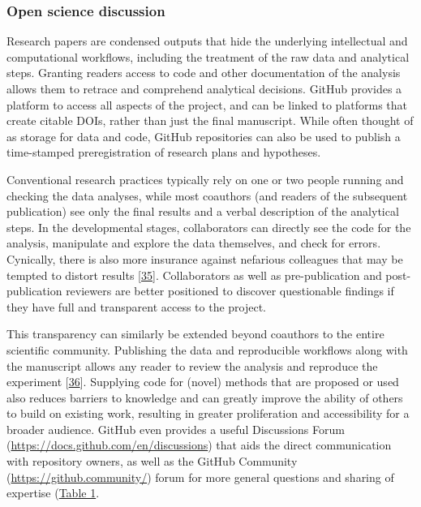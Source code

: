\hypertarget{open-science-discussion}{%
\subsubsection{Open science discussion}\label{open-science-discussion}}

Research papers are condensed outputs that hide the underlying intellectual and computational workflows, including the treatment of the raw data and analytical steps.
Granting readers access to code and other documentation of the analysis allows them to retrace and comprehend analytical decisions.
GitHub provides a platform to access all aspects of the project, and can be linked to platforms that create citable DOIs, rather than just the final manuscript.
While often thought of as storage for data and code, GitHub repositories can also be used to publish a time-stamped preregistration of research plans and hypotheses.

Conventional research practices typically rely on one or two people running and checking the data analyses, while most coauthors (and readers of the subsequent publication) see only the final results and a verbal description of the analytical steps.
In the developmental stages, collaborators can directly see the code for the analysis, manipulate and explore the data themselves, and check for errors.
Cynically, there is also more insurance against nefarious colleagues that may be tempted to distort results {[}\protect\hyperlink{ref-18PTmKJkq}{35}{]}.
Collaborators as well as pre-publication and post-publication reviewers are better positioned to discover questionable findings if they have full and transparent access to the project.

This transparency can similarly be extended beyond coauthors to the entire scientific community.
Publishing the data and reproducible workflows along with the manuscript allows any reader to review the analysis and reproduce the experiment {[}\protect\hyperlink{ref-NOgBWVAr}{36}{]}.
Supplying code for (novel) methods that are proposed or used also reduces barriers to knowledge and can greatly improve the ability of others to build on existing work, resulting in greater proliferation and accessibility for a broader audience.
GitHub even provides a useful Discussions Forum (\url{https://docs.github.com/en/discussions}) that aids the direct communication with repository owners, as well as the GitHub Community (\url{https://github.community/}) forum for more general questions and sharing of expertise (\protect\hyperlink{tbl:roles}{Table 1}.

